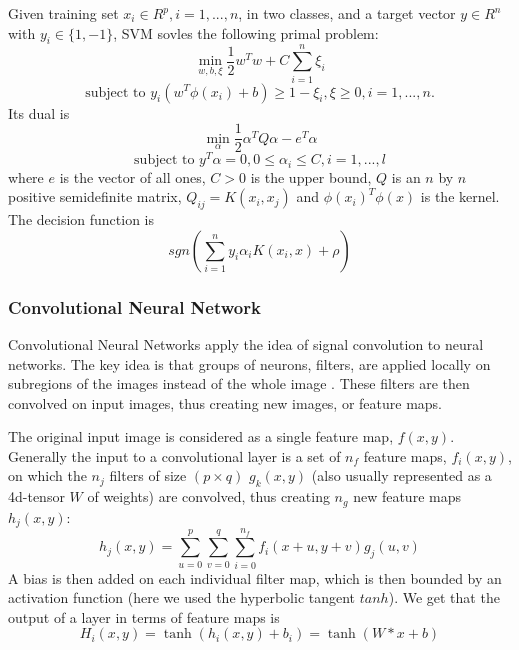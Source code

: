 \documentclass{acm_proc_article-sp}
\begin{document}
Given training set $x_i\in R^p,i=1,...,n$, in two classes, and a target vector $y\in R^n$ with $y_i\in \{1,-1\}$, SVM sovles the following primal problem:
\begin{equation}
\min_{w,b,\xi} \frac12 w^T w + C \sum_{i=1}^n \xi_i \label{eq:lsvm1}
\end{equation}
\[
\mbox{subject to } y_i (w^T \phi(x_i)+b)\geq 1-\xi_i,
\xi\geq 0, i=1,...,n.
\]
Its dual is
\begin{equation}
\min_{\alpha}\frac12 \alpha^T Q\alpha - e^T\alpha \label{eq:lsvm2}
\end{equation}
\[
\mbox{subject to } y^T\alpha = 0, 0\leq \alpha_i\leq C,i=1,...,l
\]
where $e$ is the vector of all ones, $C>0$ is the upper bound, $Q$ is an $n$ by $n$ positive semidefinite matrix, $Q_{ij}=K(x_i,x_j)$ and $\phi(x_i)^T\phi(x)$ is the kernel. The decision function is 
\begin{equation}
sgn(\sum_{i=1}^n y_i\alpha_i K(x_i,x)+\rho) \label{eq:lsvm3}
\end{equation}


\subsubsection{Convolutional Neural Network}
Convolutional Neural Networks apply the idea of signal convolution to neural networks. The key idea is that groups of neurons, filters, are applied locally on subregions of the images instead of the whole image \cite{726791}. These filters are then convolved on input images, thus creating new images, or feature maps.

The original input image is considered as a single feature map, $f(x,y)$. Generally the input to a convolutional layer is a set of $n_f$ feature maps, $f_i(x,y)$, on which the $n_j$ filters of size $(p\times q)$ $g_k(x,y)$ (also usually represented as a 4d-tensor $W$ of weights) are convolved, thus creating $n_g$ new feature maps $h_j(x,y)$:
\begin{equation}
 h_j(x,y) = \sum_{u=0}^p\sum_{v=0}^q\sum_{i=0}^{n_f} f_i(x+u,y+v)g_j(u,v)  \label{eq:cnn1}
 \end{equation}
A bias is then added on each individual filter map, which is then bounded by an activation function (here we used the hyperbolic tangent $tanh$). We get that the output of a layer in terms of feature maps is 
\begin{equation}
H_i(x,y) = \tanh(h_i(x,y) + b_i) = \tanh(W\ast x + b) \label{eq:cnn2}
\end{equation}
\end{document}
